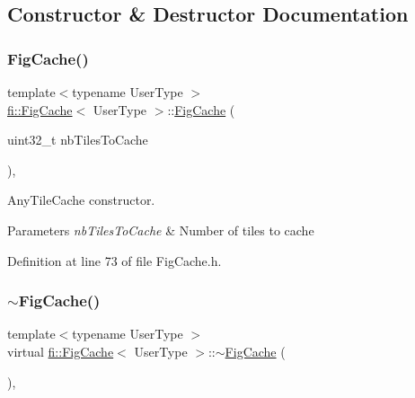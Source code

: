 \subsection{Constructor \& Destructor Documentation}
\mbox{\label{classfi_1_1FigCache_a374d90ca00fbfb190ca48df105275aed}} 
\subsubsection{\texorpdfstring{Fig\+Cache()}{FigCache()}}
{\footnotesize\ttfamily template$<$typename User\+Type $>$ \\
\hyperlink{classfi_1_1FigCache}{fi\+::\+Fig\+Cache}$<$ User\+Type $>$\+::\hyperlink{classfi_1_1FigCache}{Fig\+Cache} (\begin{DoxyParamCaption}\item[{uint32\+\_\+t}]{nb\+Tiles\+To\+Cache }\end{DoxyParamCaption})\hspace{0.3cm}{\ttfamily [inline]}, {\ttfamily [explicit]}}



Any\+Tile\+Cache constructor. 


\begin{DoxyParams}{Parameters}
{\em nb\+Tiles\+To\+Cache} & Number of tiles to cache \\
\hline
\end{DoxyParams}


Definition at line 73 of file Fig\+Cache.\+h.

\mbox{\label{classfi_1_1FigCache_ad2b4ed889aecc7e9c8d332e85fc863a8}} 
\subsubsection{\texorpdfstring{$\sim$\+Fig\+Cache()}{~FigCache()}}
{\footnotesize\ttfamily template$<$typename User\+Type $>$ \\
virtual \hyperlink{classfi_1_1FigCache}{fi\+::\+Fig\+Cache}$<$ User\+Type $>$\+::$\sim$\hyperlink{classfi_1_1FigCache}{Fig\+Cache} (\begin{DoxyParamCaption}{ }\end{DoxyParamCaption})\hspace{0.3cm}{\ttfamily [inline]}, {\ttfamily [virtual]}}



